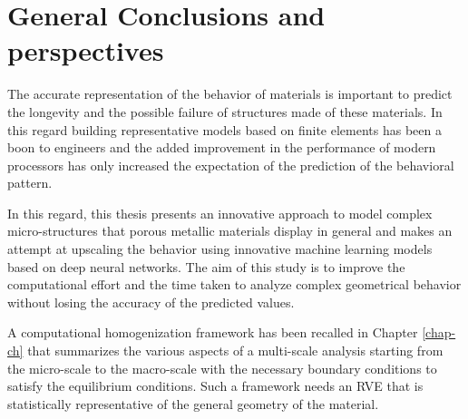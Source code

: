 \chapter{General Conclusions and perspectives}

The accurate representation of the behavior of materials is important to predict the longevity and the possible failure of structures made of these materials. In this regard building representative models based on finite elements has been a boon to engineers and the added improvement in the performance of modern processors has only increased the expectation of the prediction of the behavioral pattern.

In this regard, this thesis presents an innovative approach to model complex micro-structures that porous metallic materials display in general and makes an attempt at upscaling the behavior using innovative machine learning models based on deep neural networks. The aim of this study is to improve the computational effort and the time taken to analyze complex geometrical behavior without losing the accuracy of the predicted values.

A computational homogenization framework has been recalled in Chapter \ref{chap-ch} that summarizes the various aspects of a multi-scale analysis starting from the micro-scale to the macro-scale with the necessary boundary conditions to satisfy the equilibrium conditions. Such a framework needs an RVE that is statistically representative of the general geometry of the material. 


